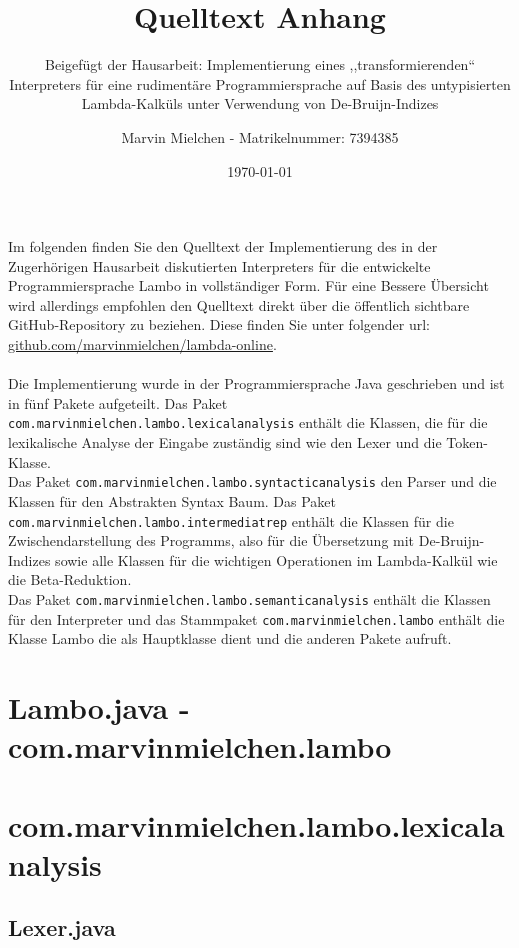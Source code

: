 \documentclass{article}
\title{Quelltext Anhang}
\author{Marvin Mielchen - Matrikelnummer: 7394385}
\subtitle{Beigefügt der Hausarbeit: Implementierung eines ,,transformierenden“ Interpreters für eine rudimentäre Programmiersprache auf Basis des untypisierten Lambda-Kalküls unter Verwendung von De-Bruijn-Indizes}
\date{\today}
\begin{document}
\maketitle
Im folgenden finden Sie den Quelltext der Implementierung des in der Zugerhörigen Hausarbeit diskutierten Interpreters für die entwickelte Programmiersprache Lambo in vollständiger Form. Für eine Bessere Übersicht wird allerdings empfohlen den Quelltext direkt über die öffentlich sichtbare GitHub-Repository zu beziehen. Diese finden Sie unter folgender url: \href{https://github.com/marvinmielchen/lambda-online}{github.com/marvinmielchen/lambda-online}.\\\\
Die Implementierung wurde in der Programmiersprache Java geschrieben und ist in fünf Pakete aufgeteilt. 
Das Paket \texttt{com.marvinmielchen.lambo.lexicalanalysis} enthält die Klassen, die für die lexikalische Analyse der Eingabe zuständig sind wie den Lexer und die Token-Klasse. 
\\Das Paket \texttt{com.marvinmielchen.lambo.syntacticanalysis} den Parser und die Klassen für den Abstrakten Syntax Baum. 
Das Paket \texttt{com.marvinmielchen.lambo.intermediatrep} enthält die Klassen für die Zwischendarstellung des Programms, also für die Übersetzung mit De-Bruijn-Indizes sowie alle Klassen für die wichtigen Operationen im Lambda-Kalkül wie die Beta-Reduktion. 
\\Das Paket \texttt{com.marvinmielchen.lambo.semanticanalysis} enthält die Klassen für den Interpreter und das Stammpaket \texttt{com.marvinmielchen.lambo} enthält die Klasse Lambo die als Hauptklasse dient und die anderen Pakete aufruft.

\tableofcontents

\newpage

\section{Lambo.java - com.marvinmielchen.lambo}


\section{com.marvinmielchen.lambo.lexicalanalysis}

\subsection{Lexer.java}

\end{document}
